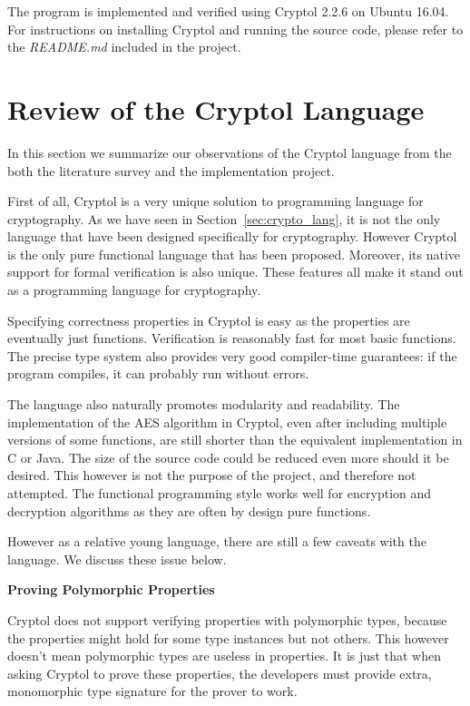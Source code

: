 \documentclass[a4paper, notitlepage]{report}
\renewcommand{\paragraph}[1]{\vspace*{1em}\noindent\textbf{#1}\hspace*{1em}}
\begin{document}
The program is implemented and verified using Cryptol 2.2.6 on
Ubuntu 16.04.
For instructions on installing Cryptol and running the source code,
please refer to the \emph{README.md} included in the project.

\section{Review of the Cryptol Language}
\label{sec:review}

In this section we summarize our observations of the Cryptol language from the both
 the literature survey and the implementation project. 

First of all, Cryptol is a very unique solution to programming language for cryptography.
As we have seen in Section~\ref{sec:crypto_lang}, it is not the only language that have
been designed specifically for cryptography. However Cryptol is the only pure functional
language that has been proposed. Moreover, its native support for formal verification is
also unique. These features all make it stand out as a programming language for 
cryptography.

Specifying correctness properties in Cryptol is easy as the properties are eventually
just functions. Verification is reasonably fast for most basic functions. 
The precise type system also provides very good compiler-time guarantees: if the program 
compiles, it can probably run without errors.

The language also naturally promotes modularity and readability.
The implementation of the AES algorithm in Cryptol, even after including multiple 
versions of some functions, are still shorter than the equivalent implementation
in C or Java. The size of the source code could be reduced even more should it be
 desired. This however is not the purpose of the project, and therefore not attempted.
The functional programming style works well for encryption and decryption algorithms
as they are often by design pure functions.

However as a relative young language, there are still a few caveats with the language.
We discuss these issue below.

\paragraph{Proving Polymorphic Properties}

Cryptol does not support verifying properties with polymorphic types, because the 
properties might hold for some type instances but not others. This however doesn't mean
polymorphic types are useless in properties. It is just that when asking Cryptol
to prove these properties, the developers must provide extra, monomorphic type
signature for the prover to work.
\end{document}
